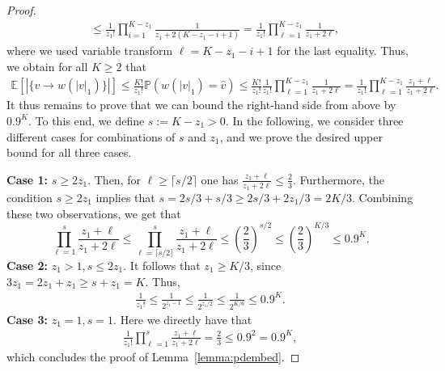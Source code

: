 \documentclass[11pt]{article}
\numberwithin{equation}{section}
\newcommand{\p}{\mathbb{P}} %
\newcommand{\E}{\mathbb{E}} %
\theoremstyle{definition}
\begin{document}
\begin{proof}
\begin{align*}
    &
    \leq
    \frac{1}{z_1!} \prod_{i=1}^{K-z_1} \frac{1}{z_1 + 2(K-z_1 - i+ 1)}
    =
    \frac{1}{z_1!} \prod_{\ell=1}^{K-z_1} \frac{1}{z_1 + 2\ell},
\end{align*}
where we used variable transform $\ell=K-z_1-i+1$ for the last equality. Thus, we obtain for all $K\geq 2$ that 
\begin{align}\label{eq:outdegree bound}
	\E \left[| \{ v \rightarrow w \left(|v|_1\right) \}|\right]\leq \frac{K!}{z_1! } \p\left(w\left(|v|_1\right) =  \hat{v} \right)
    \leq \frac{K!}{z_1!} \frac{1}{z_1!} \prod_{\ell=1}^{K-z_1} \frac{1}{z_1 + 2\ell}
	= 
	\frac{1}{z_1!} \prod_{\ell=1}^{K- z_1} \frac{z_1+\ell}{z_1+2\ell}.
\end{align}
It thus remains to prove that we can bound the right-hand side from above by $0.9^K$. To this end, we define $s:=K-z_1>0$. In the following, we consider three different cases for combinations of $s$ and $z_1$, and we prove the desired upper bound for all three cases.

    \noindent
    \textbf{Case 1:}  $s\geq 2z_1$. Then, for $\ell \geq \lceil s/2 \rceil$ one has $\frac{z_1+\ell}{z_1+2\ell} \leq \frac{2}{3}$. Furthermore, the condition $s\geq 2z_1$ implies that
    $s = 2s/3 + s/3 \geq 2s/3 + 2z_{1}/3 = 2K/3$. 
    Combining these two observations, we get that
    \begin{equation*}
        \prod_{\ell=1}^{s}\frac{z_1+\ell}{z_1+2\ell} \leq \prod_{\ell=\lceil s/2 \rceil}^{s}\frac{z_1+\ell}{z_1+2\ell} \leq \left(\frac{2}{3}\right)^{s/2} \leq \left(\frac{2}{3}\right)^{K/3} \leq 0.9^K.
    \end{equation*}
    \textbf{Case 2:}   $z_1> 1, s\leq 2z_1$. 
    It follows that $z_1 \geq K/3$, since 
    $3 z_{1} = 2 z_{1} + z_{1} \geq s + z_{1} = K$. 
    Thus, 
    \begin{align*}
        \frac{1}{z_1!}\leq \frac{1}{2^{z_1-1}} \leq \frac{1}{2^{z_1/2}} \leq \frac{1}{2^{K/6}} \leq 0.9^K.
    \end{align*}
\textbf{Case 3:} $z_1=1, s=1$. Here we directly have that
\begin{align*}
    \frac{1}{z_1!} \prod_{\ell=1}^{s} \frac{z_1+\ell}{z_1+2\ell} = \frac{2}{3} \leq 0.9^2 = 0.9^K,
\end{align*}
which concludes the proof of Lemma~\ref{lemma:pdembed}.
\end{proof}
\end{document}
